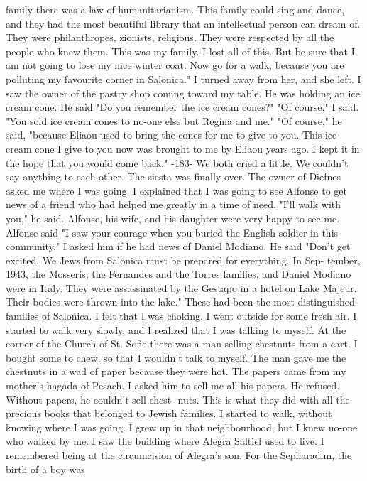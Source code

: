 family there was a law of humanitarianism. This family could sing and 
dance, and they had the most beautiful library that an intellectual person can dream of. They were philanthropes, zionists, religious. They 
were respected by all the people who knew them. This was my family. I 
lost all of this. But be sure that I am not going to lose my nice winter coat. Now go for a walk, because you are polluting my favourite corner in Salonica." I turned away from her, and she left. 
I saw the owner of the pastry shop coming toward my table. He was 
holding an ice cream cone. He said "Do you remember the ice cream 
cones?" 
"Of course," I said. "You sold ice cream cones to no-one else but 
Regina and me." 
"Of course," he said, "because Eliaou used to bring the cones for me 
to give to you. This ice cream cone I give to you now was brought to me 
by Eliaou years ago. I kept it in the hope that you would come back." 
-183- 
We both cried a little. We couldn't say anything to each other. 
The siesta was finally over. The owner of Diefnes asked me where I 
was going. I explained that I was going to see Alfonse to get news of a 
friend who had helped me greatly in a time of need. 
"I'll walk with you," he said. 
Alfonse, his wife, and his daughter were very happy to see me. Alfonse said "I saw your courage when you buried the English soldier in 
this community." 
I asked him if he had news of Daniel Modiano. He said "Don't get 
excited. We Jews from Salonica must be prepared for everything. In Sep-
tember, 1943, the Mosseris, the Fernandes and the Torres families, and 
Daniel Modiano were in Italy. They were assassinated by the Gestapo in 
a hotel on Lake Majeur. Their bodies were thrown into the lake." 
These had been the most distinguished families of Salonica. I felt 
that I was choking. I went outside for some fresh air. I started to 
walk very slowly, and I realized that I was talking to myself. At the 
corner of the Church of St. Sofie there was a man selling chestnuts from 
a cart. I bought some to chew, so that I wouldn't talk to myself. 
The man gave me the chestnuts in a wad of paper because they were hot. 
The papers came from my mother's hagada of Pesach. I asked him to sell 
me all his papers. He refused. Without papers, he couldn't sell chest-
nuts. This is what they did with all the precious books that belonged to 
Jewish families. 
I started to walk, without knowing where I was going. I grew up in 
that neighbourhood, but I knew no-one who walked by me. I saw the building where Alegra Saltiel used to live. I remembered being at the circumcision of Alegra's son. For the Sepharadim, the birth of a boy was 
